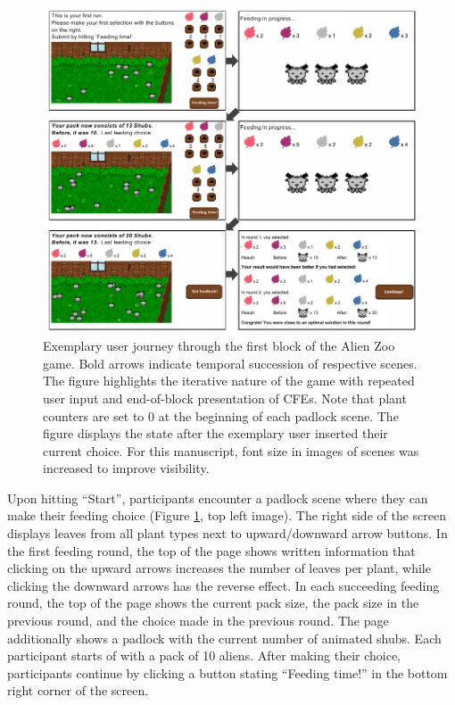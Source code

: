 \begin{figure}
   \centering
   \includegraphics[width=\textwidth]{./media/FigureGameInterface.pdf}
   \caption{Exemplary user journey through the first block of the Alien Zoo game. Bold arrows indicate temporal succession of respective scenes. The figure highlights the iterative nature of the game with repeated user input and end-of-block presentation of \glspl{CFE}. Note that plant counters are set to 0 at the beginning of each padlock scene. The figure displays the state after the exemplary user inserted their current choice. For this manuscript, font size in images of scenes was increased to improve visibility.}
   \label{fig:StudyStructure2}
 \end{figure}

Upon hitting ``Start'', participants encounter a padlock scene where they can make their feeding choice (Figure \ref{fig:StudyStructure2}, top left image).
The right side of the screen displays leaves from all plant types next to upward/downward arrow buttons. 
In the first feeding round, the top of the page shows written information that clicking on the upward arrows increases the number of leaves per plant, while clicking the downward arrows has the reverse effect.
In each succeeding feeding round, the top of the page shows the current pack size, the pack size in the previous round, and the choice made in the previous round.
The page additionally shows a padlock with the current number of animated shubs.
Each participant starts of with a pack of 10 aliens.
After making their choice, participants continue by clicking a button stating ``Feeding time!'' in the bottom right corner of the screen.

